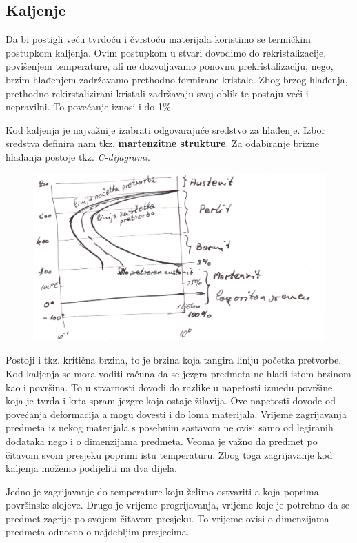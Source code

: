 \documentclass[a4paper,12pt]{article}
\numberwithin{figure}{section}
\begin{document}
\subsection{Kaljenje}
Da bi postigli veću tvrdoću i čvrstoću materijala koristimo se termičkim postupkom kaljenja. Ovim postupkom u stvari dovodimo do rekristalizacije, povišenjem temperature, ali ne dozvoljavamo ponovnu prekristalizaciju, nego, brzim hlađenjem zadržavamo prethodno formirane kristale. Zbog brzog hlađenja, prethodno rekirstalizirani kristali zadržavaju svoj oblik te postaju veći i nepravilni. To povećanje iznosi i do 1$\%$. \par
Kod kaljenja je najvažnije izabrati odgovarajuće sredstvo za hlađenje. Izbor sredstva definira nam tkz. \textbf{martenzitne strukture}. Za odabiranje brizne hlađanja postoje tkz. \textit{C-dijagrami}.
\begin{figure}[!h]
\centering
\includegraphics[scale=0.17]{image_65.png}
\end{figure}
\FloatBarrier
Postoji i tkz. kritična brzina, to je brzina koja tangira liniju početka pretvorbe. Kod kaljenja se mora voditi računa da se jezgra predmeta ne hladi istom brzinom kao i površina. To u stvarnosti dovodi do razlike u napetosti između površine koja je tvrđa i krta spram jezgre koja ostaje žilavija. Ove napetosti dovode od povećanja deformacija a mogu dovesti i do loma materijala. Vrijeme zagrijavanja predmeta iz nekog materijala s posebnim sastavom ne ovisi samo od legiranih dodataka nego i o dimenzijama predmeta. Veoma je važno da predmet po čitavom svom presjeku poprimi istu temperaturu. Zbog toga zagrijavanje kod kaljenja možemo podijeliti na dva dijela.\par
Jedno je zagrijavanje do temperature koju želimo ostvariti a koja poprima površinske slojeve. Drugo je vrijeme progrijavanja, vrijeme koje je potrebno da se predmet zagrije po svojem čitavom presjeku. To vrijeme ovisi o dimenzijama predmeta odnosno o najdebljim presjecima.\par 
\end{document}
